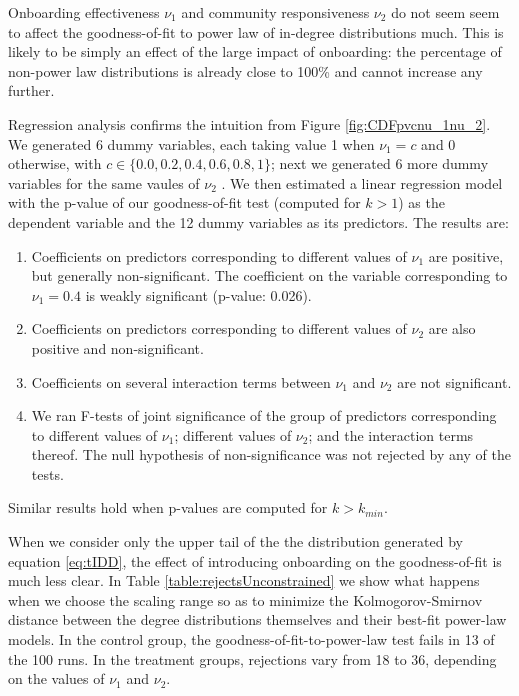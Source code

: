 \documentclass{article}
\begin{document}
Onboarding effectiveness $\nu_1$ and community responsiveness $\nu_2$ do not seem seem to affect the goodness-of-fit to power law of in-degree distributions much. This is likely to be simply an effect of the large impact of onboarding: the percentage of non-power law distributions is already close to 100\% and cannot increase any further.

Regression analysis confirms the intuition from Figure \ref{fig:CDFpvcnu_1nu_2}. We generated 6 dummy variables, each taking value 1 when $\nu_1 =  c$ and 0 otherwise, with $c \in \{0.0, 0.2, 0.4, 0.6, 0.8, 1\}$; next we generated 6 more dummy variables for the same vaules of $\nu_2$ . We then estimated a linear regression model with the p-value of our goodness-of-fit test (computed for $k >1$) as the dependent variable and the 12 dummy variables as its predictors. The results are:

\begin{enumerate}
\item Coefficients on predictors corresponding to different values of $\nu_1$ are positive, but generally non-significant. The coefficient on the variable corresponding to $\nu_1 = 0.4$ is weakly significant (p-value: 0.026).
\item Coefficients on predictors corresponding to different values of $\nu_2$ are also  positive and non-significant. 
\item Coefficients on several interaction terms between $\nu_1$ and $\nu_2$ are not significant. 
\item We ran F-tests of joint significance of the group of predictors corresponding to different values of $\nu_1$; different values of $\nu_2$; and the interaction terms thereof. The null hypothesis of non-significance was not rejected by any of the tests. 
\end{enumerate}

Similar results hold when p-values are computed for $k > k_{min}$. 

When we consider only the upper tail of the the distribution generated by equation \ref{eq:tIDD}, the effect of introducing onboarding on the goodness-of-fit is much less clear. In Table \ref{table:rejectsUnconstrained} we show what happens when we choose the scaling range so as to minimize the Kolmogorov-Smirnov distance between the degree distributions themselves and their best-fit power-law models. In the control group, the goodness-of-fit-to-power-law test fails in 13 of the 100 runs. In the treatment groups, rejections vary from 18 to 36, depending on the values of $\nu_1$ and $\nu_2$.  
\end{document}
